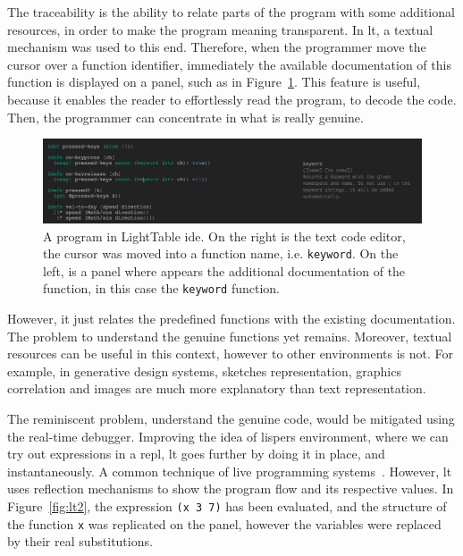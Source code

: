 The traceability is the ability to relate parts of the program with some additional resources, in order to make the program meaning transparent. In \ac{lt}, a textual mechanism was used to this end. Therefore, when the programmer move the cursor over a function identifier, immediately the available documentation of this function is displayed on a panel, such as in Figure~\ref{fig:lt1}. This feature is useful, because it enables the reader to effortlessly read the program, to decode the code. Then, the programmer can concentrate in what is really genuine.

\begin{figure}[h]
  \centering
  \includegraphics[width=1.0\textwidth]{img/lt2}
    \caption{A program in LightTable \ac{ide}. On the right is the text code editor, the cursor was moved into a function name, i.e. {\tt keyword}. On the left, is a panel where appears the additional documentation of the function, in this case the {\tt keyword} function.}  
  \label{fig:lt1}
\end{figure}

However, it just relates the predefined functions with the existing documentation. The problem to understand the genuine functions yet remains. Moreover, textual resources can be useful in this context, however to other environments is not. For example, in generative design systems, sketches representation, graphics correlation and images are much more explanatory than text representation.  

The reminiscent problem, understand the genuine code, would be mitigated using the real-time debugger. Improving the idea of lispers environment, where we can try out expressions in a \ac{repl}, \ac{lt} goes further by doing it in place, and instantaneously. A common technique of live programming systems~\cite{PER-GRA:2007,sorensen2005impromptu,mclean2010visualisation}. However, \ac{lt} uses reflection mechanisms to show the program flow and its respective values. In Figure~\ref{fig:lt2},  the expression {\tt (x 3 7)} has been evaluated, and the structure of the function {\tt x} was replicated on the panel, however the variables were replaced by their real substitutions.

